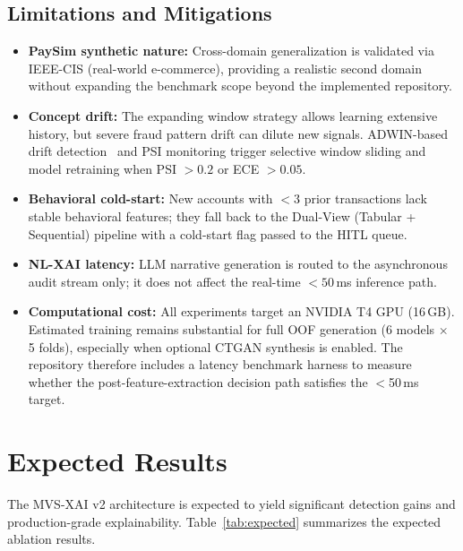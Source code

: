 \documentclass[10pt,a4paper,twocolumn]{article}
\begin{document}
\subsection{Limitations and Mitigations}
\begin{itemize}
    \item \textbf{PaySim synthetic nature:} Cross-domain generalization is validated via IEEE-CIS (real-world e-commerce), providing a realistic second domain without expanding the benchmark scope beyond the implemented repository.
    \item \textbf{Concept drift:} The expanding window strategy allows learning extensive history, but severe fraud pattern drift can dilute new signals. ADWIN-based drift detection~\cite{suarez2023} and PSI monitoring trigger selective window sliding and model retraining when PSI $> 0.2$ or ECE $> 0.05$.
    \item \textbf{Behavioral cold-start:} New accounts with $<3$ prior transactions lack stable behavioral features; they fall back to the Dual-View (Tabular + Sequential) pipeline with a cold-start flag passed to the HITL queue.
    \item \textbf{NL-XAI latency:} LLM narrative generation is routed to the asynchronous audit stream only; it does not affect the real-time $<50$\,ms inference path.
    \item \textbf{Computational cost:} All experiments target an NVIDIA T4 GPU (16\,GB). Estimated training remains substantial for full OOF generation (6 models $\times$ 5 folds), especially when optional CTGAN synthesis is enabled. The repository therefore includes a latency benchmark harness to measure whether the post-feature-extraction decision path satisfies the $<$50\,ms target.
\end{itemize}

\section{Expected Results}

The MVS-XAI v2 architecture is expected to yield significant detection gains and production-grade explainability. Table~\ref{tab:expected} summarizes the expected ablation results.
\end{document}

